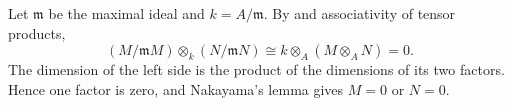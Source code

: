 Let $\mathfrak{m}$ be the maximal ideal and $k=A/\mathfrak{m}$. By  and associativity of tensor products,
\[(M/\mathfrak{m}M)\otimes_k(N/\mathfrak{m}N)\cong k\otimes_A(M\otimes_A N)=0.\]
The dimension of the left side is the product of the dimensions of its two factors. Hence one factor is zero, and Nakayama's lemma gives $M=0$ or $N=0$.
